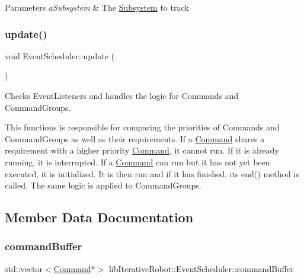 \begin{DoxyParams}{Parameters}
{\em a\+Subsystem} & The \mbox{\hyperlink{classlib_iterative_robot_1_1_subsystem}{Subsystem}} to track \\
\hline
\end{DoxyParams}
\mbox{\label{classlib_iterative_robot_1_1_event_scheduler_a9643c8e8dd7a87a1a3419415c7cc46bc}} 
\subsubsection{\texorpdfstring{update()}{update()}}
{\footnotesize\ttfamily void Event\+Scheduler\+::update (\begin{DoxyParamCaption}{ }\end{DoxyParamCaption})}



Checks Event\+Listeners and handles the logic for Commands and Command\+Groups. 

This functions is responsible for comparing the priorities of Commands and Command\+Groups as well as their requirements. If a \mbox{\hyperlink{classlib_iterative_robot_1_1_command}{Command}} shares a requirement with a higher priority \mbox{\hyperlink{classlib_iterative_robot_1_1_command}{Command}}, it cannot run. If it is already running, it is interrupted. If a \mbox{\hyperlink{classlib_iterative_robot_1_1_command}{Command}} can run but it has not yet been executed, it is initialized. It is then run and if it has finished, its end() method is called. The same logic is applied to Command\+Groups. 

\subsection{Member Data Documentation}
\mbox{\label{classlib_iterative_robot_1_1_event_scheduler_a1ddae49a738b69e0e73b4b529a585226}} 
\subsubsection{\texorpdfstring{commandBuffer}{commandBuffer}}
{\footnotesize\ttfamily std\+::vector$<$\mbox{\hyperlink{classlib_iterative_robot_1_1_command}{Command}}$\ast$$>$ lib\+Iterative\+Robot\+::\+Event\+Scheduler\+::command\+Buffer\hspace{0.3cm}{\ttfamily [private]}}




